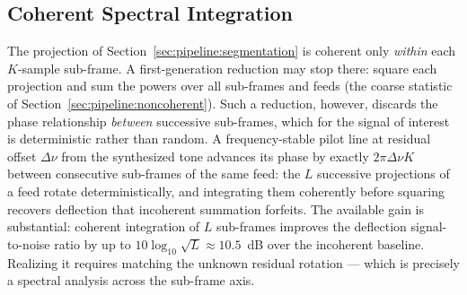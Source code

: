 \subsection{Coherent Spectral Integration}
\label{sec:pipeline:coherent}

The projection of Section~\ref{sec:pipeline:segmentation} is coherent only \emph{within} each $K$-sample sub-frame. A first-generation reduction may stop there: square each projection and sum the powers over all sub-frames and feeds (the coarse statistic of Section~\ref{sec:pipeline:noncoherent}). Such a reduction, however, discards the phase relationship \emph{between} successive sub-frames, which for the signal of interest is deterministic rather than random. A frequency-stable pilot line at residual offset $\Delta\nu$ from the synthesized tone advances its phase by exactly $2\pi \Delta\nu K$ between consecutive sub-frames of the same feed: the $L$ successive projections of a feed rotate deterministically, and integrating them coherently before squaring recovers deflection that incoherent summation forfeits. The available gain is substantial: coherent integration of $L$ sub-frames improves the deflection signal-to-noise ratio by up to $10 \log_{10} \sqrt{L} \approx 10.5$~dB over the incoherent baseline. Realizing it requires matching the unknown residual rotation --- which is precisely a spectral analysis across the sub-frame axis.

